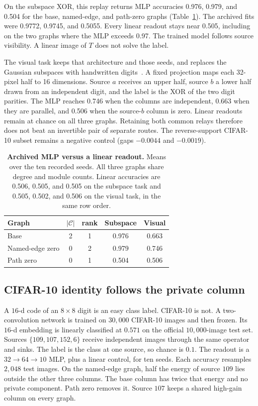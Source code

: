 On the subspace XOR, this replay returns MLP accuracies 0.976, 0.979, and
0.504 for the base, named-edge, and path-zero graphs
(Table~\ref{tab:executed}). The archived fits were 0.9772, 0.9745, and
0.5055. Every linear readout stays near 0.505, including on the two graphs
where the MLP exceeds 0.97. The trained model follows source visibility. A
linear image of $T$ does not solve the label.

The visual task keeps that architecture and those seeds, and replaces the Gaussian
subspaces with handwritten digits~\cite{optdigits1998}. A fixed projection maps
each 32-pixel half to 16 dimensions. Source $a$ receives an upper half, source
$b$ a lower half drawn from an independent digit, and the label is the XOR of
the two digit parities. The MLP reaches 0.746 when the columns are independent,
0.663 when they are parallel, and 0.506 when the source-$b$ column is zero.
Linear readouts remain at chance on all three graphs. Retaining both
common relays therefore does not beat an invertible pair of separate routes.
The reverse-support CIFAR-10 subset remains a negative control
(gaps $-0.0044$ and $-0.0019$).

\begin{table}[t]
\centering
\caption{\textbf{Archived MLP versus a linear readout.} Means over the ten
recorded seeds. All three graphs share degree and module counts. Linear
accuracies are 0.506, 0.505, and 0.505 on the subspace task and 0.505,
0.502, and 0.506 on the visual task, in the same row order.}
\label{tab:executed}
\small
\setlength{\tabcolsep}{3pt}
\begin{tabular}{@{}lcccc@{}}
\toprule
Graph & $|\mathcal C|$ & rank & Subspace & Visual \\
\midrule
Base & 2 & 1 & 0.976 & 0.663 \\
Named-edge zero & 0 & 2 & 0.979 & 0.746 \\
Path zero & 0 & 1 & 0.504 & 0.506 \\
\bottomrule
\end{tabular}
\end{table}

\subsection{CIFAR-10 identity follows the private column}
\label{sec:population}

A $16$-d code of an $8{\times}8$ digit is an easy class label. CIFAR-10 is not.
A two-convolution network is trained on $30{,}000$ CIFAR-10 images and then
frozen. Its $16$-d embedding is linearly classified at $0.571$ on the official
$10{,}000$-image test set. Sources $\{109,107,152,6\}$ receive independent
images through the same operator and sinks. The label is the class at one
source, so chance is $0.1$. The readout is a $32\!\to\!64\!\to\!10$ MLP, plus
a linear control, for ten seeds. Each accuracy resamples $2{,}048$ test
images. On the named-edge graph, half the energy of source $109$ lies outside
the other three columns. The base column has twice that energy and no private
component. Path zero removes it. Source $107$ keeps a shared high-gain column
on every graph.

